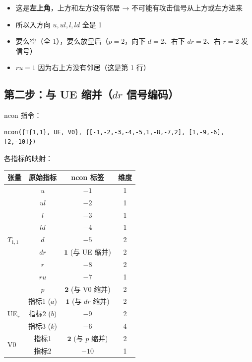 \documentclass[12pt,a4paper]{article}
\begin{document}
\begin{warnbox}[为什么只有这 2 个？]
\begin{itemize}
  \item 这是\textbf{左上角}，上方和左方没有邻居 → 不可能有攻击信号从上方或左方进来
  \item 所以入方向 $u, ul, l, ld$ 全是 1
  \item 要么空（全 1），要么放皇后（$p{=}2$，向下 $d{=}2$、右下 $dr{=}2$、右 $r{=}2$ 发信号）
  \item $ru = 1$ 因为右上方没有邻居（这是第 1 行）
\end{itemize}
\end{warnbox}

\subsection{第二步：与 UE 缩并（$dr$ 信号编码）}

ncon 指令：
\begin{verbatim}
ncon({T{1,1}, UE, V0}, {[-1,-2,-3,-4,-5,1,-8,-7,2], [1,-9,-6], [2,-10]})
\end{verbatim}

各指标的映射：

\begin{center}
\begin{tabular}{l|c|c|c}
\toprule
\textbf{张量} & \textbf{原始指标} & \textbf{ncon 标签} & \textbf{维度} \\
\midrule
\multirow{9}{*}{$T_{1,1}$} & $u$ & $-1$ & 1 \\
 & $ul$ & $-2$ & 1 \\
 & $l$ & $-3$ & 1 \\
 & $ld$ & $-4$ & 1 \\
 & $d$ & $-5$ & 2 \\
 & $dr$ & $\mathbf{1}$ (与 UE 缩并) & 2 \\
 & $r$ & $-8$ & 2 \\
 & $ru$ & $-7$ & 1 \\
 & $p$ & $\mathbf{2}$ (与 V0 缩并) & 2 \\
\midrule
\multirow{3}{*}{UE$_r$} & 指标1 ($a$) & $\mathbf{1}$ (与 $dr$ 缩并) & 2 \\
 & 指标2 ($b$) & $-9$ & 2 \\
 & 指标3 ($k$) & $-6$ & 4 \\
\midrule
\multirow{2}{*}{V0} & 指标1 & $\mathbf{2}$ (与 $p$ 缩并) & 2 \\
 & 指标2 & $-10$ & 1 \\
\bottomrule
\end{tabular}
\end{center}
\end{document}
